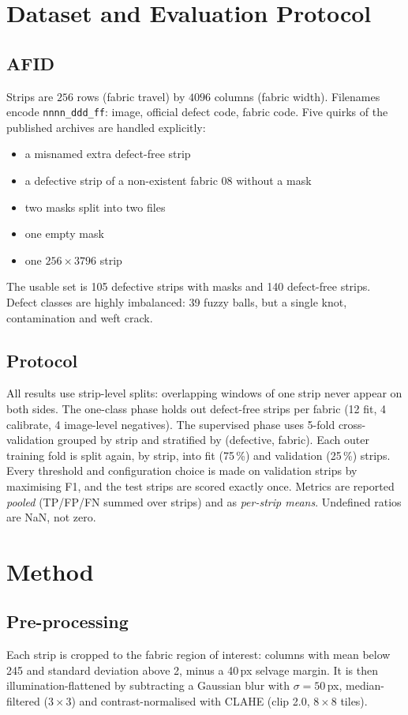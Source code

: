 \documentclass[conference]{IEEEtran}
\begin{document}
\section{Dataset and Evaluation Protocol}
\subsection{AFID}
Strips are $256$ rows (fabric travel) by $4096$ columns (fabric width). Filenames encode \texttt{nnnn\_ddd\_ff}: image, official defect code, fabric code. Five quirks of the published archives are handled explicitly:
\begin{itemize}
  \item a misnamed extra defect-free strip
  \item a defective strip of a non-existent fabric 08 without a mask
  \item two masks split into two files
  \item one empty mask
  \item one $256\times3796$ strip
\end{itemize}
The usable set is 105 defective strips with masks and 140 defect-free strips. Defect classes are highly imbalanced: 39 fuzzy balls, but a single knot, contamination and weft crack.

\subsection{Protocol}
All results use strip-level splits: overlapping windows of one strip never appear on both sides. The one-class phase holds out defect-free strips per fabric (12 fit, 4 calibrate, 4 image-level negatives). The supervised phase uses 5-fold cross-validation grouped by strip and stratified by (defective, fabric). Each outer training fold is split again, by strip, into fit (75\,\%) and validation (25\,\%) strips. Every threshold and configuration choice is made on validation strips by maximising F1, and the test strips are scored exactly once. Metrics are reported \emph{pooled} (TP/FP/FN summed over strips) and as \emph{per-strip means}. Undefined ratios are NaN, not zero.

\section{Method}
\subsection{Pre-processing}
Each strip is cropped to the fabric region of interest: columns with mean below 245 and standard deviation above 2, minus a 40\,px selvage margin. It is then illumination-flattened by subtracting a Gaussian blur with $\sigma=50$\,px, median-filtered ($3\times3$) and contrast-normalised with CLAHE (clip 2.0, $8\times8$ tiles).
\end{document}
